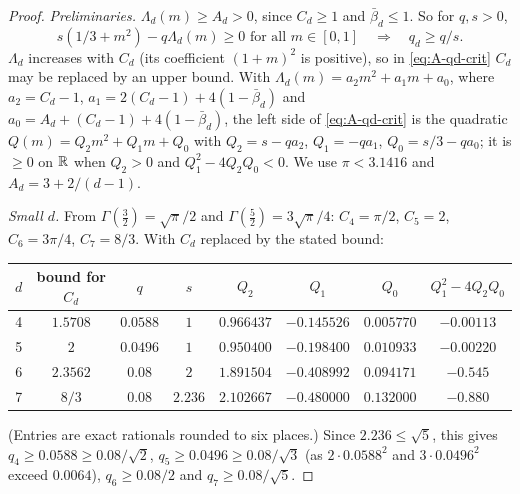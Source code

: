 \documentclass[11pt]{article}
\newcommand{\Abb}{\bar\beta}
\begin{document}
\begin{proof}
\emph{Preliminaries.} $\Lambda_d(m) \ge A_d > 0$, since $C_d \ge 1$ and $\Abb_d \le 1$. So for $q, s > 0$,
\begin{equation}\label{eq:A-qd-crit}
  s(1/3 + m^2) - q\Lambda_d(m) \ge 0 \text{ for all } m \in [0, 1]
  \quad\Longrightarrow\quad q_d \ge q/s.
\end{equation}
$\Lambda_d$ increases with $C_d$ (its coefficient $(1+m)^2$ is positive), so in
\eqref{eq:A-qd-crit} $C_d$ may be replaced by an upper bound. With
$\Lambda_d(m) = a_2 m^2 + a_1 m + a_0$, where $a_2 = C_d - 1$, $a_1 = 2(C_d - 1) + 4(1 - \Abb_d)$ and
$a_0 = A_d + (C_d - 1) + 4(1 - \Abb_d)$, the left side of \eqref{eq:A-qd-crit} is the quadratic
$Q(m) = Q_2m^2 + Q_1m + Q_0$ with $Q_2 = s - qa_2$, $Q_1 = -qa_1$, $Q_0 = s/3 - qa_0$; it is $\ge 0$ on
$\mathbb{R}$ when $Q_2 > 0$ and $Q_1^2 - 4Q_2Q_0 < 0$. We use $\pi < 3.1416$ and $A_d = 3 + 2/(d-1)$.

\emph{Small $d$.} From $\Gamma(\frac32) = \sqrt\pi/2$ and $\Gamma(\frac52) = 3\sqrt\pi/4$:
$C_4 = \pi/2$, $C_5 = 2$, $C_6 = 3\pi/4$, $C_7 = 8/3$. With $C_d$ replaced by the stated bound:
\begin{center}
\small
\begin{tabular}{cccccccc}
\toprule
$d$ & bound for $C_d$ & $q$ & $s$ & $Q_2$ & $Q_1$ & $Q_0$ & $Q_1^2 - 4Q_2Q_0$\\
\midrule
4 & $1.5708$ & $0.0588$ & $1$ & $0.966437$ & $-0.145526$ & $0.005770$ & $-0.00113$\\
5 & $2$ & $0.0496$ & $1$ & $0.950400$ & $-0.198400$ & $0.010933$ & $-0.00220$\\
6 & $2.3562$ & $0.08$ & $2$ & $1.891504$ & $-0.408992$ & $0.094171$ & $-0.545$\\
7 & $8/3$ & $0.08$ & $2.236$ & $2.102667$ & $-0.480000$ & $0.132000$ & $-0.880$\\
\bottomrule
\end{tabular}
\end{center}
(Entries are exact rationals rounded to six places.) Since $2.236 \le \sqrt5$, this gives $q_4 \ge 0.0588 \ge 0.08/\sqrt2$, $q_5 \ge 0.0496 \ge 0.08/\sqrt3$ (as
$2 \cdot 0.0588^2$ and $3 \cdot 0.0496^2$ exceed $0.0064$), $q_6 \ge 0.08/2$ and $q_7 \ge 0.08/\sqrt5$.


\end{proof}
\end{document}
